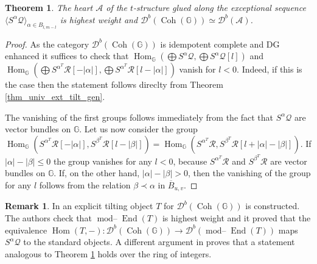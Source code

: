 \documentclass[12pt,a4paper]{amsart}
\newcommand{\aA}{{\mathcal{A}}}
\newcommand{\dD}{{\mathcal{D}}}
\newcommand{\qQ}{{\mathcal{Q}}}
\newcommand{\rR}{{\mathcal{R}}}
\newcommand{\tr}{{\mbox{$t$-struc}\-tu\-r}}
\newcommand{\Hom}{\mathop{\textrm{Hom}}\nolimits}
\newcommand{\End}{\mathop{\textrm{End}}\nolimits}
\newcommand{\Coh}{\mathop{\operatorname{Coh}}\nolimits}
\newcommand{\modu}{\mathop{\textrm{mod--}}}
\newcommand{\ol}[1]{\overline{#1}}
\newtheorem{THM}[LEM]{Theorem}
\theoremstyle{definition}
\newtheorem{REM}[LEM]{Remark}
\begin{document}
\begin{THM}\cite{BuchLeuVdB} \label{thm_Gr}\cite{Efi}
	The heart $\aA$ of the \tr e glued along the exceptional sequence $\langle S^\alpha \qQ \rangle_{\alpha \in B_{l,m-l}}$ is highest weight and $\dD^b(\Coh(\mathbb{G})) \simeq \dD^b(\aA)$.
\end{THM}
\begin{proof}
As the category $\dD^b(\Coh(\mathbb{G}))$ is idempotent complete and DG enhanced it suffices to check that $\Hom_{\mathbb{G}}(\bigoplus S^\alpha \qQ, \bigoplus S^\alpha\qQ[l])$ and $\Hom_{\mathbb{G}}(\bigoplus S^{\alpha^T} \rR[-|\alpha|], \bigoplus S^{\alpha^T}\rR[l-|\alpha|])$ vanish for $l<0$. Indeed, if this is the case then the statement follows direclty from Theorem \ref{thm_univ_ext_tilt_gen}.

The vanishing of the first groups follows immediately from the fact that $S^\alpha \qQ$ are vector bundles on $\mathbb{G}$. Let us now consider the group $\Hom_{\mathbb{G}} (S^{\alpha^T} \rR[-|\alpha|], S^{\beta^T}\rR[l-|\beta|]) = \Hom_{\mathbb{G}}(S^{\alpha^T}\rR, S^{\beta^T}\rR[l+|\alpha| - |\beta|])$. If $|\alpha|-|\beta|\leq 0$ the group vanishes for any $l<0$, because $S^{\alpha^T} \rR$ and $S^{\beta^T} \rR$ are vector bundles on $\mathbb{G}$. If, on the other hand, $|\alpha| - |\beta|>0$, then the vanishing of the group for any $l$ follows from the relation $\beta \prec \alpha$ in $\ol{B}_{u,v}$.
\end{proof}

\begin{REM}
	In \cite{BuchLeuVdB} an explicit tilting object $T$ for $\dD^b(\Coh(\mathbb{G}))$ is constructed. The authors check that $\modu \End(T)$ is highest weight and it proved that  the equivalence $\Hom(T,-)\colon \dD^b(\Coh(\mathbb{G})) \to \dD^b(\modu \End(T))$ maps $S^\alpha \qQ$ to the standard objects. A different argument in \cite{Efi} proves that a statement analogous to Theorem \ref{thm_Gr} holds over the ring of integers.
\end{REM}
\end{document}
